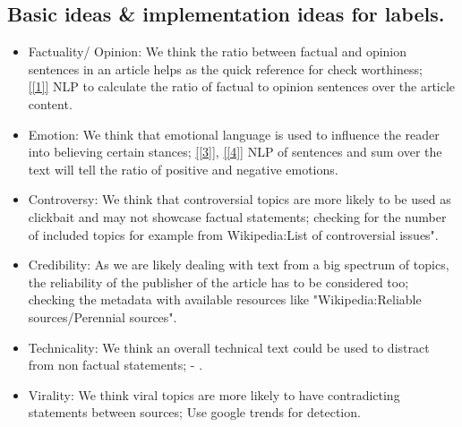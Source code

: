 \documentclass[10pt]{article}
\begin{document}
\subsection{Basic ideas \& implementation ideas for labels.}
\begin{itemize}
\item Factuality/ Opinion: We think the ratio between factual and opinion sentences in an article helps as the quick reference for check worthiness;\\
\ref{[1]} NLP to calculate the ratio of factual to opinion sentences over the article content.
\item Emotion: We think that emotional language is used to influence the reader into believing certain stances; \ref{[3]}, \ref{[4]} NLP of sentences and sum over the text will tell the ratio of positive and negative emotions.
\item Controversy: We think that controversial topics are more likely to be used as clickbait and may not showcase factual statements; checking for the number of included topics for example from Wikipedia:List of controversial issues".
\item Credibility: As we are likely dealing with text from a big spectrum of topics, the reliability of the publisher of the article has to be considered too; checking the metadata with available resources like  "Wikipedia:Reliable sources/Perennial sources".
\item Technicality: We think an overall technical text could be used to distract from non factual statements; - .
\item Virality: We think viral topics are more likely to have contradicting statements between sources; Use google trends for detection.
\end{itemize}


\end{document}
